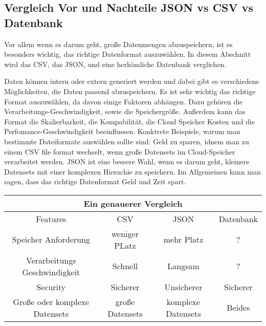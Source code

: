 \subsection{Vergleich Vor und Nachteile JSON vs CSV vs Datenbank}
Vor allem wenn es darum geht, große Datenmengen abzuspeichern, ist es besonders wichtig, das richtige Datenformat auszuwählen. In diesem Abschnitt wird das CSV, das JSON, und eine herkömliche Datenbank verglichen. 

Daten können intern oder extern generiert werden und dabei gibt es verschiedene Möglichkeiten, die Daten passend abzuspeichern. Es ist sehr wichtig das richtige Format auszuwählen, da davon einige Faktoren abhängen. Dazu gehören die Verarbeitungs-Geschwindigkeit, sowie die Speichergröße. 
Außerdem kann das Format die Skalierbarkeit, die Kompabilität, die Cloud Speicher Kosten und die Perfomance-Geschwindigkeit beeinflussen. 
Konktrete Beispiele, warum man bestimmte Dateiformate auswählen sollte sind: Geld zu sparen, idnem man zu einem CSV file format wechselt, wenn große Datensets im Cloud-Speicher verarbeitet werden. JSON ist eine bessere Wahl, wenn es darum geht, kleinere Datensets mit einer komplexen Hierachie zu speichern. 
Im Allgemeinen kann man sagen, dass das richtige Datenformat Geld und Zeit spart.  

\begin{center}
    \begin{tabular}{ |c|c|c|c| } 
     \hline
     \multicolumn{4}{|c|}{Ein genauerer Vergleich } \\
     \hline
     \hline
     Features & CSV & JSON & Datenbank \\ 
     \hline 
     \hline
     Speicher Anforderung & weniger PLatz & mehr Platz & ? \\ 
     \hline
     Verarbeitungs Geschwindigkeit & Schnell & Langsam & ? \\ 
     \hline
     Security & Sicherer & Unsicherer & Sicherer \\ 
     \hline
     Große oder komplexe Datensets & große Datensets & komplexe Datensets & Beides \\ 
     \hline
    \end{tabular}
    \end{center}

